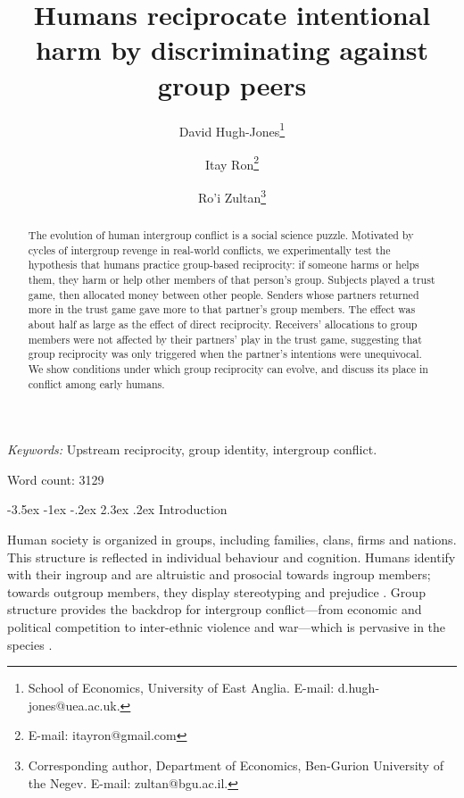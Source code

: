 \documentclass[12pt,a4paper]{article}\usepackage[]{graphicx}\usepackage[]{color}
\title{\bf\sffamily Humans reciprocate intentional harm by discriminating against group peers}
\author{David Hugh-Jones\thanks{School of Economics, University of East Anglia. E-mail: d.hugh-jones@uea.ac.uk.} \and Itay Ron\thanks{E-mail: itayron@gmail.com} \and Ro'i Zultan\thanks{Corresponding author, Department of Economics, Ben-Gurion University of the Negev. E-mail: zultan@bgu.ac.il.}}
\date{}%
\makeatletter
\renewcommand\section{\@startsection {section}{1}{\z@}%
{-3.5ex \@plus -1ex \@minus -.2ex}%
{2.3ex \@plus.2ex}%
{\bf\sffamily\Large}}
\makeatother
\begin{document}
\maketitle

\begin{abstract}
The evolution of human intergroup conflict is a social science puzzle. 
Motivated by cycles of intergroup revenge in real-world conflicts, we experimentally
test the hypothesis that humans practice group-based reciprocity: if someone
harms or helps them, they harm or help other members of that person's group.
Subjects played a trust game, then allocated money between other people. Senders
whose partners returned more in the trust game gave more to that partner's group
members. The effect was about half as large as the effect of direct reciprocity.
Receivers' allocations to group members were not affected by their partners’ 
play in the trust game, suggesting that group reciprocity was only triggered when the
partner's intentions were unequivocal. We show conditions under which group 
reciprocity can evolve, and discuss its place in conflict among early humans.
\end{abstract}

\emph{Keywords:} Upstream reciprocity, group identity, intergroup conflict.

Word count: 3129



\newpage

\section{Introduction}

Human society is organized in groups, including families, clans, firms and nations. This
structure is reflected in individual behaviour and cognition. Humans identify
with their ingroup and are altruistic and prosocial towards ingroup members;
towards outgroup members, they display stereotyping and prejudice
\citep{tajfel1979integrative,yamagishi2000thegroup,balliet2014ingroup,DeDreu2014,chen2009group,chen2011potential}.
Group structure provides the backdrop for intergroup conflict---from economic
and political competition to inter-ethnic violence and war---which is pervasive
in the species \citep{world_bank_world_2011}.
\end{document}
